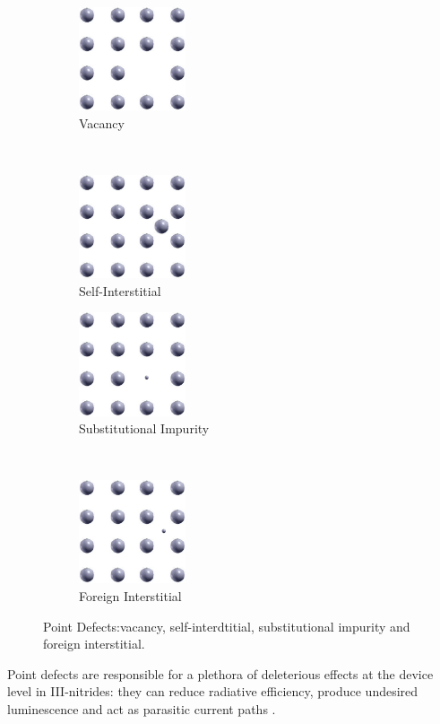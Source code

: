 \begin{figure}[t!]
	\centering
	\begin{subfigure}[t]{0.3\textwidth}
		\centering
		\includegraphics[height=1.2in]{Figs/Ch1/vacancy.png}
		\caption{Vacancy}
		\vspace*{1cm}
	\end{subfigure}%
	~ 
	\begin{subfigure}[t]{0.3\textwidth}
		\centering
		\includegraphics[height=1.2in]{Figs/Ch1/self-inter.png}
		\caption{Self-Interstitial}
	\end{subfigure}
	
	\begin{subfigure}[b]{0.3\textwidth}
		\centering
		\includegraphics[height=1.2in]{Figs/Ch1/sub-impure.png}
		\caption{Substitutional Impurity}
	\end{subfigure}%
	~ 
	\begin{subfigure}[b]{0.3\textwidth}
		\centering
		\includegraphics[height=1.2in]{Figs/Ch1/foreign.png}
		\caption{Foreign Interstitial}
	\end{subfigure}
	\caption{Point Defects:vacancy, self-interdtitial, substitutional impurity and foreign interstitial.}
	\label{1.6}
\end{figure}
\FloatBarrier
 Point defects are responsible for a plethora of deleterious effects at the device level in III-nitrides: they can reduce radiative efficiency, produce undesired luminescence and act as parasitic current paths \cite{Reshchikov2005}.
